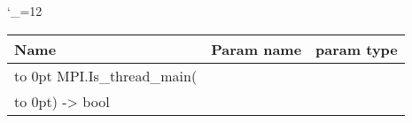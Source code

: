 \begingroup \catcode`\_=12 \tt
\begin{tabular}{lll}
\toprule
\textrm{Name}&\textrm{Param name}&\textrm{param type}\\
\midrule
\hbox to 0pt {MPI.Is_thread_main(\hss}\\
\hbox to 0pt{) -> bool\hss}\\
\bottomrule
\end{tabular}
\endgroup
